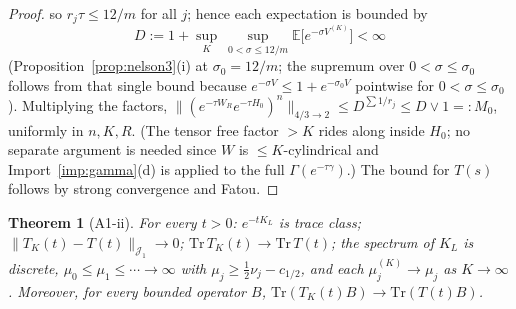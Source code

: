 \documentclass[11pt,a4paper]{article}
\theoremstyle{plain}
\newtheorem{theorem}{Theorem}[section]
\theoremstyle{definition}
\newcommand{\E}{\mathbb{E}}
\newcommand{\Jone}{\mathcal J_1}
\newcommand{\Trace}{\mathrm{Tr}}
\newcommand{\Gam}{\Gamma}
\begin{document}
\begin{proof}
so $r_j\tau\le12/m$ for all $j$; hence each expectation is bounded by
\[
 D:=1+\sup_{K}\ \sup_{0<\sigma\le12/m}\E\bigl[e^{-\sigma V^{(K)}}\bigr]
 <\infty
\]
(Proposition~\ref{prop:nelson3}(i) at $\sigma_0=12/m$; the supremum over
$0<\sigma\le\sigma_0$ follows from that single bound because
$e^{-\sigma V}\le1+e^{-\sigma_0V}$ pointwise for $0<\sigma\le\sigma_0$).
Multiplying the factors,
$\|(e^{-\tau W_R}e^{-\tau H_0})^n\|_{4/3\to2}
\le D^{\sum1/r_j}\le D\vee1=:M_0$, uniformly in $n,K,R$. (The tensor free
factor $>K$ rides along inside
$H_0$; no separate argument is needed since $W$ is $\le K$-cylindrical
and Import~\ref{imp:gamma}(d) is applied to the full $\Gam(e^{-\tau
\gamma})$.) The bound for $T(s)$ follows by strong convergence and
Fatou.
\end{proof}

\begin{theorem}[A1-ii]\label{thm:A1ii}
For every $t>0$: $e^{-tK_L}$ is trace class;
$\|T_K(t)-T(t)\|_{\Jone}\to0$; $\Trace\,T_K(t)\to\Trace\,T(t)$; the
spectrum of $K_L$ is discrete, $\mu_0\le\mu_1\le\cdots\to\infty$ with
$\mu_j\ge\tfrac12\nu_j-c_{1/2}$, and each $\mu^{(K)}_j\to\mu_j$ as
$K\to\infty$. Moreover, for every bounded operator $B$,
$\Trace(T_K(t)B)\to\Trace(T(t)B)$.
\end{theorem}
\end{document}
